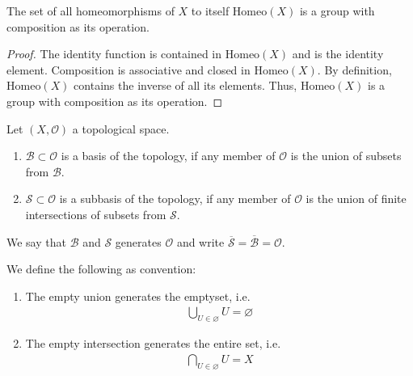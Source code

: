 \begin{thmbox}
    \begin{proposition}
        The set of all homeomorphisms of \(X\) to itself \(\mathrm{Homeo}(X)\) is a group with composition as its operation.
    \end{proposition}
\end{thmbox}

\begin{proof}
    The identity function is contained in \(\mathrm{Homeo}(X)\) and is the identity element. Composition is associative and closed in \(\mathrm{Homeo}(X)\). By definition, \(\mathrm{Homeo}(X)\) contains the inverse of all its elements. Thus, \(\mathrm{Homeo}(X)\) is a group with composition as its operation.
\end{proof}

\begin{defbox}
    \begin{definition}[Base]
        Let \((X, \mathcal{O})\) a {\color{mathif}topological space}.
        \begin{enumerate}
            \item \(\mathcal{B} \subset \mathcal{O}\) is a {\color{maththen}basis} of the topology, if any member of \(\mathcal{O}\) is the {\color{mathif}union of subsets} from \(\mathcal{B}\).
            \item \(\mathcal{S} \subset \mathcal{O}\) is a {\color{maththen}subbasis} of the topology, if any member of \(\mathcal{O}\) is the {\color{mathif}union of finite intersections of subsets} from \(\mathcal{S}\).
        \end{enumerate}
        We say that \(\mathcal{B}\) and \(\mathcal{S}\) {\color{maththen}generates} \(\mathcal{O}\) and write \(\overline{\mathcal{S}} = \overline{\mathcal{B}} = \mathcal{O}\).
    \end{definition}
\end{defbox}

\begin{rembox}
    \begin{remark}
        We define the following as convention:
        \begin{enumerate}
            \item The empty union generates the emptyset, i.e.
            \begin{align*}
                \bigcup_{U \in \varnothing} U = \varnothing
            \end{align*}
            \item The empty intersection generates the entire set, i.e.
            \begin{align*}
                \bigcap_{U \in \varnothing} U = X
            \end{align*}
        \end{enumerate}
    \end{remark}
\end{rembox}

